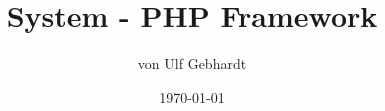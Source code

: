 \documentclass{beamer}
\title{System - PHP Framework}
\author{von Ulf Gebhardt}
\date{\today}
\begin{document}
\frame{\titlepage}







\appendix



\end{document}
